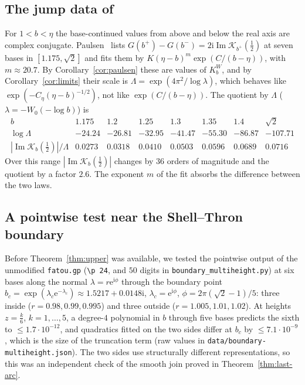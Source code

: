 \documentclass[11pt]{amsart}
\theoremstyle{definition}
\newcommand{\Kk}{K}
\newcommand{\eee}{\mathrm{e}}
\newcommand{\ii}{\mathrm{i}}
\begin{document}
\subsection{The jump data of~\cite{Paulsen2026}}\label{sec:jump}
For $1<b<\eta$ the base-continued values from above and below the real axis
are complex conjugate.  Paulsen~\cite[(29)]{Paulsen2026} lists
$G(b^+)-G(b^-)=2\ii\operatorname{Im}\mathcal K_{b^+}(\tfrac12)$ at seven bases in
$[1.175,\sqrt2]$ and fits them by $K(\eta-b)^m\exp(C/(b-\eta))$, with
$m\approx20.7$.  By Corollary~\ref{cor:paulsen} these are values of $\Kk^W_b$, and
by Corollary~\ref{cor:limits} their scale is $\Lambda=\exp(4\pi^2/\log\lambda)$,
which behaves like $\exp(-C_\eta(\eta-b)^{-1/2})$, not like $\exp(C/(b-\eta))$.
The quotient by $\Lambda$ ($\lambda=-W_0(-\log b)$) is
\[
\begin{array}{c|ccccccc}
 b & 1.175 & 1.2 & 1.25 & 1.3 & 1.35 & 1.4 & \sqrt2\\\hline
 \log\Lambda & -24.24 & -26.81 & -32.95 & -41.47 & -55.30 & -86.87 & -107.71\\
 |\operatorname{Im}\mathcal K_b(\tfrac12)|/\Lambda & 0.0273 & 0.0318 & 0.0410 & 0.0503 & 0.0596 & 0.0689 & 0.0716
\end{array}
\]
Over this range $|\operatorname{Im}\mathcal K_b(\tfrac12)|$ changes by $36$ orders of magnitude and the
quotient by a factor $2.6$.  The exponent $m$ of the fit absorbs the
difference between the two laws.

\subsection{A pointwise test near the Shell--Thron boundary}\label{sec:bndtest}
Before Theorem~\ref{thm:upper} was available, we tested the pointwise output of
the unmodified \texttt{fatou.gp} (\texttt{\textbackslash p 24}, and $50$ digits in
\nolinkurl{boundary_multiheight.py}) at six bases along the normal
$\lambda=r\eee^{\ii\phi}$ through the boundary point $b_c=\exp(\lambda_c\eee^{-\lambda_c})\approx1.5217+0.0148\ii$,
$\lambda_c=\eee^{\ii\phi}$, $\phi=2\pi(\sqrt2-1)/5$: three inside ($r=0.98,0.99,0.995$) and three
outside ($r=1.005,1.01,1.02$).  At heights $z=\tfrac k6$, $k=1,\dots,5$, a degree-$4$
polynomial in $b$ through five bases predicts the sixth to $\le1.7\cdot10^{-12}$, and
quadratics fitted on the two sides differ at $b_c$ by $\le7.1\cdot10^{-9}$, which is the size
of the truncation term (raw values in \nolinkurl{data/boundary-multiheight.json}).  The
two sides use structurally different representations, so this was an
independent check of the smooth join proved in Theorem~\ref{thm:last-arc}.
\end{document}
